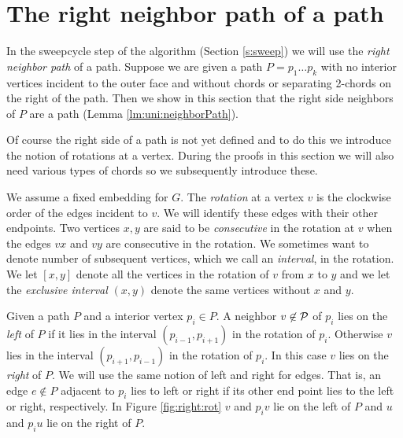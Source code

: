 

\section{The right neighbor path of a path}
  \label{s:rightNeighbour}
  In the sweepcycle step of the algorithm (Section \ref{s:sweep}) we will use the \emph{right neighbor path} of a path. Suppose we are given a path $P = p_1 \ldots p_k$ with no interior vertices incident to the outer face and without chords or separating 2-chords on the right of the path.
  Then we show in this section that the right side neighbors of $P$ are a path (Lemma \ref{lm:uni:neighborPath}).

  Of course the right side of a path is not yet defined and to do this we introduce the notion of rotations at a vertex. During the proofs in this section we will also need various types of chords so we subsequently introduce these.

    We assume a fixed embedding for $G$. The \emph{rotation} at a vertex $v$ is the clockwise order of the edges incident to $v$. We will identify these edges with their other endpoints.
    Two vertices $x, y$ are said to be \emph{consecutive} in the rotation at $v$ when the edges $vx$ and $vy$ are consecutive in the rotation.
    We sometimes want to denote number of subsequent vertices, which we call an \emph{interval}, in the rotation. We let $[x,y]$ denote all the vertices in the rotation of $v$ from $x$ to $y$ and we let the \emph{exclusive interval} $(x,y)$ denote the same vertices without $x$ and $y$.

    Given a path $P$ and a interior vertex $p_i \in P$. A neighbor $v \not \in \mathcal{P}$ of $p_i$ lies on the \emph{left} of $P$ if it lies in the interval $(p_{i-1}, p_{i+1})$ in the rotation of $p_{i}$. Otherwise $v$ lies in the interval $(p_{i+1}, p_{i-1})$ in the rotation of $p_i$. In this case $v$ lies on the \emph{right} of $P$.
    We will use the same notion of left and right for edges. That is, an edge $e\nin P$ adjacent to $p_i$ lies to left or right if its other end point lies to the left or right, respectively. In Figure \ref{fig:right:rot} $v$ and $p_i v$ lie on the left of $P$ and $u$ and $p_i u$ lie on the right of $P$.

